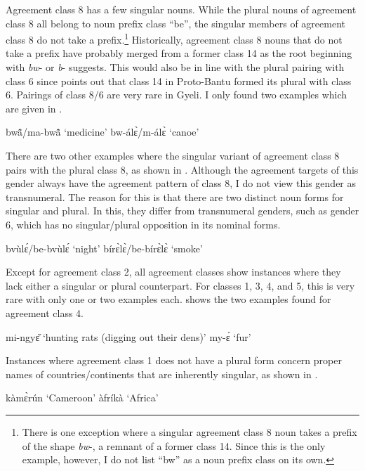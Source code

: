 Agreement class 8 has a few singular nouns. While the plural nouns of agreement class 8 all belong to noun prefix class ``be'', the singular members of agreement class 8 do not take a prefix.\footnote{There is one exception where a singular agreement class 8 noun takes a prefix of the shape {\itshape bw}-, a remnant of a former class 14. Since this is the only example, however, I do not list ``bw'' as a noun prefix class on its own.}
 Historically, agreement class 8 nouns that do not take a prefix have probably merged from a former class 14 as the root  beginning with {\itshape bw}- or {\itshape b}- suggests. This would also be in line with the plural pairing with class 6 since \citet[100]{meeussen67} points out that class 14 in Proto-Bantu formed its plural with class 6. Pairings of class 8/6 are very rare in Gyeli. I only found two examples which are given in .

\ea\label{8/6}
\ea bwã̂/ma-bwã̂ `medicine'
\ex bw-álɛ̀/m-álɛ̀ `canoe'
\z
\z



There are two other examples where the singular variant of agreement class 8 pairs with the plural class 8, as shown in . Although the agreement targets of this gender always have the agreement pattern of class 8, I do not view this gender as transnumeral. The reason for this is that there are two distinct noun forms for singular and plural. In this, they differ from transnumeral genders, such as gender 6, which has no singular/plural opposition in its nominal forms. 

\ea\label{8/8}
\ea bvùlɛ́/be-bvùlɛ́ `night'
\ex bírɛ̀lɛ̀/be-bírɛ̀lɛ̀ `smoke'
\z
\z

Except for agreement class 2, all agreement classes show instances where they lack either a singular or plural counterpart. For classes 1, 3, 4, and 5, this is very rare with only one or two examples each.  shows the two examples found for agreement class 4.


\ea\label{0/4}
\ea mi-ngyɛ̌ `hunting rats (digging out their dens)'
\ex my-ɛ́ `fur'
\z
\z

\noindent Instances where agreement class 1 does not have a plural form concern proper names of countries/continents that are inherently singular, as shown in .

\ea\label{1/0}
\ea kàmɛ̀rún `Cameroon'
\ex àfríkà `Africa'
\z
\z

